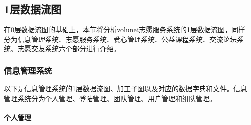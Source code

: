 \subsection{1层数据流图}   
在0层数据流图的基础上，本节将分析volunet志愿服务系统的1层数据流图，同样分为信息管理系统、志愿服务系统、爱心管理系统、公益课程系统、交流论坛系统、志愿交友系统六个部分进行介绍。

\subsubsection{信息管理系统}
以下是信息管理系统的1层数据流图、加工子图以及对应的数据字典和文件。信息管理系统分为个人管理、登陆管理、团队管理、用户管理和组队管理。
\begin{figure}[H]
    \end{figure}

\paragraph{个人管理}~{}
\\


